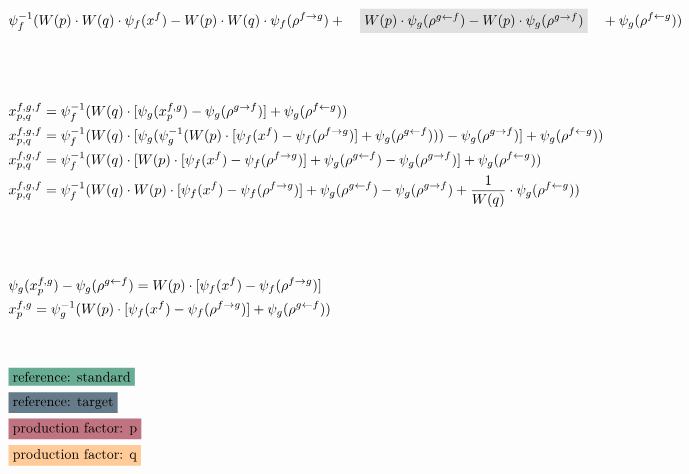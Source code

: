 \documentclass[fleqn]{article}
\begin{document}
\begin{align*}
		&\psi_{f}^{-1}(W(p) \cdot W(q) \cdot \psi_{f}(x^{f}) - W(p) \cdot W(q) \cdot \psi_{f}(\rho^{f\rightarrow g}) + \quad \colorbox{lightgray}{$W(p) \cdot \psi_{g}(\rho^{g\leftarrow f}) - W(p) \cdot \psi_{g}(\rho^{g\rightarrow f})$} \quad+ \psi_{g}(\rho^{f\leftarrow g}))\\
		\\
		\\
		\\
		&x^{f,g,f}_{p,q} = \psi_{f}^{-1}(W(q) \cdot [\psi_{g}(x_{p}^{f,g}) - \psi_{g}(\rho^{g\rightarrow f})] + \psi_{g}(\rho^{f\leftarrow g})) \\
		&x^{f,g,f}_{p,q} = \psi_{f}^{-1}(W(q) \cdot [\psi_{g}(\psi_{g}^{-1}( W(p) \cdot [\psi_{f}(x^{f}) - \psi_{f}(\rho^{f\rightarrow g})] + \psi_{g}(\rho^{g\leftarrow f})))  - \psi_{g}(\rho^{g\rightarrow f})] + \psi_{g}(\rho^{f\leftarrow g})) \\
		&x^{f,g,f}_{p,q} = \psi_{f}^{-1}(W(q) \cdot [W(p) \cdot [\psi_{f}(x^{f}) - \psi_{f}(\rho^{f\rightarrow g})] + \psi_{g}(\rho^{g\leftarrow f}) - \psi_{g}(\rho^{g\rightarrow f})]  + \psi_{g}(\rho^{f\leftarrow g})) \\
		&x^{f,g,f}_{p,q} = \psi_{f}^{-1}(W(q) \cdot W(p) \cdot [\psi_{f}(x^{f}) - \psi_{f}(\rho^{f\rightarrow g})] + \psi_{g}(\rho^{g\leftarrow f})  - \psi_{g}(\rho^{g\rightarrow f}) + \frac{1}{W(q)} \cdot \psi_{g}(\rho^{f\leftarrow g})) \\
		\\
		\\
		\\
		&\psi_{g}(x^{f,g}_{p}) - \psi_{g}(\rho^{g\leftarrow f}) = W(p) \cdot [\psi_{f}(x^{f}) - \psi_{f}(\rho^{f\rightarrow g})] \\
		&x^{f,g}_{p} = \psi_{g}^{-1}(W(p) \cdot [\psi_{f}(x^{f}) - \psi_{f}(\rho^{f\rightarrow g})] + \psi_{g}(\rho^{g\leftarrow f}))
		\\
		\\
		\\
		&\colorbox{lightgreen}{reference: standard}\\
		&\colorbox{lightblue}{reference: target}\\
		&\colorbox{lightpink}{production factor: p}\\
		&\colorbox{lightyellow}{production factor: q}
	\end{align*}
	
\end{document}
